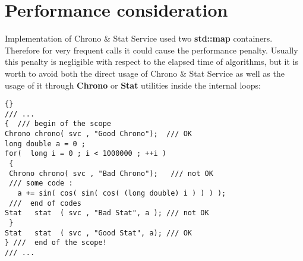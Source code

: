 \documentclass{lhcbnote}
\newcommand{\bftt}         {\ttfamily\bfseries}
\begin{document}
\chapter{Performance consideration  } 
Implementation of Chrono \& Stat Service used two {\bftt{ std::map}} 
containers. Therefore for very frequent calls it could cause the 
performance penalty.  Usually this penalty  is negligible with respect to the 
elapsed time of algorithms, but it is worth to avoid both the direct usage 
of Chrono \& Stat Service as well as the  usage of it 
through {\bftt{Chrono}} or {\bftt{Stat}} utilities inside the 
internal loops:

\begin{lstlisting}{}
/// ...
{  /// begin of the scope 
Chrono chrono( svc , "Good Chrono");  /// OK
long double a = 0 ; 
for(  long i = 0 ; i < 1000000 ; ++i ) 
 {
 Chrono chrono( svc , "Bad Chrono");   /// not OK
 /// some code :
   a += sin( cos( sin( cos( (long double) i ) ) ) ); 
 ///  end of codes
Stat   stat  ( svc , "Bad Stat", a ); /// not OK 
 }  
Stat   stat  ( svc , "Good Stat", a); /// OK 
} ///  end of the scope!
/// ...  
\end{lstlisting}  
\end{document}
